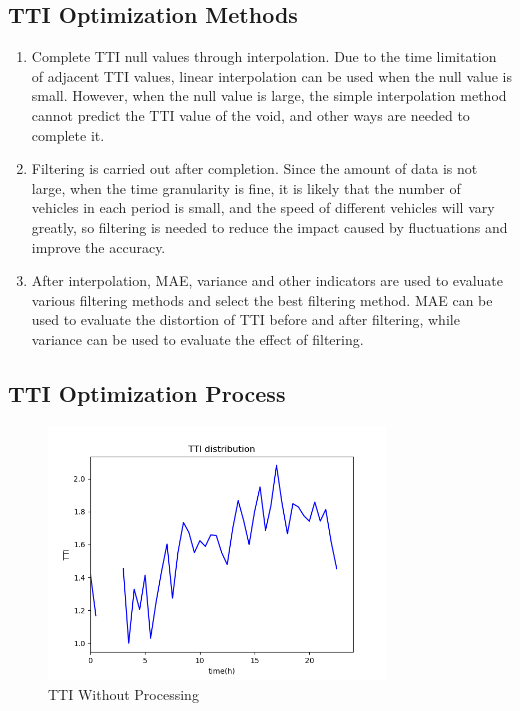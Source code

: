 \documentclass[fontset=none]{ctexart}
\theoremstyle{definition}
\theoremstyle{remark}
\begin{document}
\subsection{TTI Optimization Methods}
\begin{enumerate}
  \item Complete TTI null values through interpolation. Due to the time limitation of adjacent TTI values, linear interpolation can be used when the null value is small. However, when the null value is large, the simple interpolation method cannot predict the TTI value of the void, and other ways are needed to complete it.
  \item Filtering is carried out after completion. Since the amount of data is not large, when the time granularity is fine, it is likely that the number of vehicles in each period is small, and the speed of different vehicles will vary greatly, so filtering is needed to reduce the impact caused by fluctuations and improve the accuracy.
  \item After interpolation, MAE, variance and other indicators are used to evaluate various filtering methods and select the best filtering method. MAE can be used to evaluate the distortion of TTI before and after filtering, while variance can be used to evaluate the effect of filtering.
\end{enumerate}

\clearpage
\subsection{TTI Optimization Process}
\begin{figure}[htb]
  \centering
  \includegraphics[width=0.8\textwidth]{images/6-3-1.png}
  \caption{TTI Without Processing}
  \label{6-3-1}
\end{figure}
\end{document}
